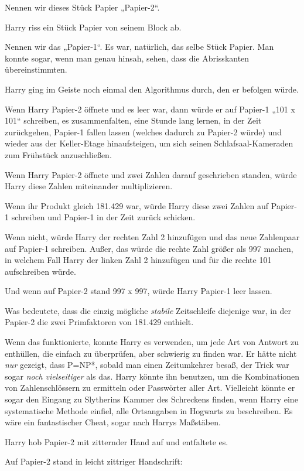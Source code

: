{Nennen wir dieses Stück Papier „Papier-2“.

Harry riss ein Stück Papier von seinem Block ab.

Nennen wir das „Papier-1“. Es war, natürlich, das selbe Stück Papier. Man konnte sogar, wenn man genau hinsah, sehen, dass die Abrisskanten übereinstimmten.

Harry ging im Geiste noch einmal den Algorithmus durch, den er befolgen würde.

Wenn Harry Papier-2 öffnete und es leer war, dann würde er auf Papier-1 „101 x 101“ schreiben, es zusammenfalten, eine Stunde lang lernen, in der Zeit zurückgehen, Papier-1 fallen lassen (welches dadurch zu Papier-2 würde) und wieder aus der Keller-Etage hinaufsteigen, um sich seinen Schlafsaal-Kameraden zum Frühstück anzuschließen.

Wenn Harry Papier-2 öffnete und zwei Zahlen darauf geschrieben standen, würde Harry diese Zahlen miteinander multiplizieren.

Wenn ihr Produkt gleich 181.429 war, würde Harry diese zwei Zahlen auf Papier-1 schreiben und Papier-1 in der Zeit zurück schicken.

Wenn nicht, würde Harry der rechten Zahl 2 hinzufügen und das neue Zahlenpaar auf Papier-1 schreiben. Außer, das würde die rechte Zahl größer als 997 machen, in welchem Fall Harry der linken Zahl 2 hinzufügen und für die rechte 101 aufschreiben würde.

Und wenn auf Papier-2 stand 997 x 997, würde Harry Papier-1 leer lassen.

Was bedeutete, dass die einzig mögliche \emph{stabile} Zeitschleife diejenige war, in der Papier-2 die zwei Primfaktoren von 181.429 enthielt.

Wenn das funktionierte, konnte Harry es verwenden, um jede Art von Antwort zu enthüllen, die einfach zu überprüfen, aber schwierig zu finden war. Er hätte nicht \emph{nur} gezeigt, dass P=NP*, sobald man einen Zeitumkehrer besaß, der Trick war sogar \emph{noch vielseitiger} als das. Harry könnte ihn benutzen, um die Kombinationen von Zahlenschlössern zu ermitteln oder Passwörter aller Art. Vielleicht könnte er sogar den Eingang zu Slytherins Kammer des Schreckens finden, wenn Harry eine systematische Methode einfiel, alle Ortsangaben in Hogwarts zu beschreiben. Es wäre ein fantastischer Cheat, sogar nach Harrys Maßstäben.

Harry hob Papier-2 mit zitternder Hand auf und entfaltete es.

Auf Papier-2 stand in leicht zittriger Handschrift:

}

